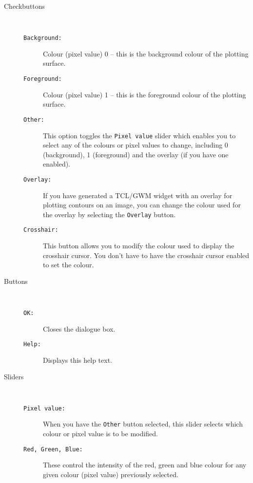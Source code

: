 \documentclass[twoside,11pt,nolof]{starlink}
\begin{document}
\begin{description}

\item[Checkbuttons]~

\begin{description}

\item[{\texttt{Background:}}] Colour (pixel value) 0 -- this is the
background colour of the plotting surface.

\item[{\texttt{Foreground:}}] Colour (pixel value) 1 -- this is the
foreground colour of the plotting surface.

\item[{\texttt{Other:}}] This option toggles the {\texttt{Pixel~value}} slider which
enables you to select any of the colours or pixel values to change,
including 0 (background), 1 (foreground) and the overlay (if you have
one enabled).

\item[{\texttt{Overlay:}}] If you have generated a TCL/GWM widget with an
overlay for plotting contours on an image, you can change the colour
used for the overlay by selecting the {\texttt{Overlay}} button.

\item[{\texttt{Crosshair:}}] This button allows you to modify the colour
used to display the crosshair cursor.  You don't have to have the
crosshair cursor enabled to set the colour.

\end{description}

\item[Buttons]~

\begin{description}

\item[{\texttt{OK:}}] Closes the {} dialogue box.

\item[{\texttt{Help:}}] Displays this help text.

\end{description}

\item[Sliders]~

\begin{description}

\item[{\texttt{Pixel~value:}}] When you have the {\texttt{Other}} button selected,
this slider selects which colour or pixel value is to be modified.

\item[{\texttt{Red, Green, Blue:}}] These control the intensity of the red,
green and blue colour for any given colour (pixel value) previously
selected.

\end{description}

\end{description}
\end{document}
